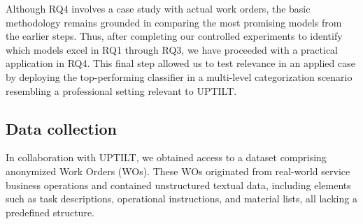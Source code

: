 Although RQ4 involves a case study with actual work orders, the basic methodology remains grounded in comparing the most promising models from the earlier steps. Thus, after completing our controlled experiments to identify which models excel in RQ1 through RQ3, we have proceeded with a practical application in RQ4. This final step allowed us to test relevance in an applied case by deploying the top-performing classifier in a multi-level categorization scenario resembling a professional setting relevant to UPTILT.

\subsection{Data collection}
%

In collaboration with UPTILT, we obtained access to a dataset comprising anonymized Work Orders (WOs). These WOs originated from real-world service business operations and contained unstructured textual data, including elements such as task descriptions, operational instructions, and material lists, all lacking a predefined structure.

